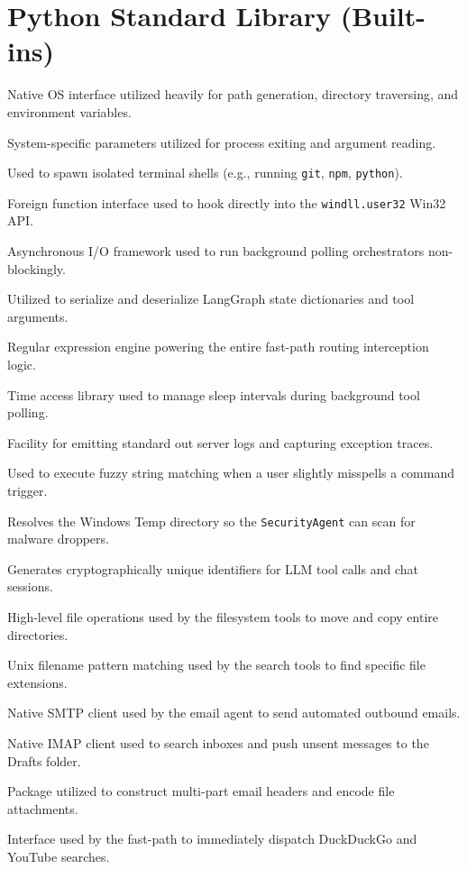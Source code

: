 \documentclass[11pt,a4paper]{report}
\begin{document}
\section{Python Standard Library (Built-ins)}
\begin{description}[leftmargin=!, labelwidth=4.5cm]
    \item[\texttt{os}] Native OS interface utilized heavily for path generation, directory traversing, and environment variables.
    \item[\texttt{sys}] System-specific parameters utilized for process exiting and argument reading.
    \item[\texttt{subprocess}] Used to spawn isolated terminal shells (e.g., running \texttt{git}, \texttt{npm}, \texttt{python}).
    \item[\texttt{ctypes}] Foreign function interface used to hook directly into the \texttt{windll.user32} Win32 API.
    \item[\texttt{asyncio}] Asynchronous I/O framework used to run background polling orchestrators non-blockingly.
    \item[\texttt{json}] Utilized to serialize and deserialize LangGraph state dictionaries and tool arguments.
    \item[\texttt{re}] Regular expression engine powering the entire fast-path routing interception logic.
    \item[\texttt{time}] Time access library used to manage sleep intervals during background tool polling.
    \item[\texttt{logging}] Facility for emitting standard out server logs and capturing exception traces.
    \item[\texttt{difflib}] Used to execute fuzzy string matching when a user slightly misspells a command trigger.
    \item[\texttt{tempfile}] Resolves the Windows Temp directory so the \texttt{SecurityAgent} can scan for malware droppers.
    \item[\texttt{uuid}] Generates cryptographically unique identifiers for LLM tool calls and chat sessions.
    \item[\texttt{shutil}] High-level file operations used by the filesystem tools to move and copy entire directories.
    \item[\texttt{fnmatch}] Unix filename pattern matching used by the search tools to find specific file extensions.
    \item[\texttt{smtplib}] Native SMTP client used by the email agent to send automated outbound emails.
    \item[\texttt{imaplib}] Native IMAP client used to search inboxes and push unsent messages to the Drafts folder.
    \item[\texttt{email.mime}] Package utilized to construct multi-part email headers and encode file attachments.
    \item[\texttt{webbrowser}] Interface used by the fast-path to immediately dispatch DuckDuckGo and YouTube searches.
\end{description}
\end{document}
